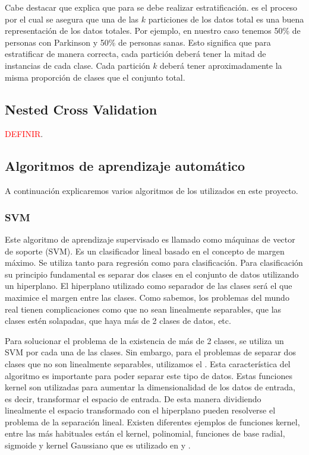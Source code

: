 Cabe destacar que \cite{CrossVal} explica que para  se debe realizar estratificación.  es el proceso por el cual se asegura que una de las $k$ particiones de los datos total es una buena representación de los datos totales. Por ejemplo, en nuestro caso tenemos 50\% de personas con Parkinson y 50\% de personas sanas. Esto significa que para estratificar de manera correcta, cada partición deberá tener la mitad de instancias de cada clase. Cada partición $k$ deberá tener aproximadamente la misma proporción de clases que el conjunto total.

\subsection{Nested Cross Validation}
\textcolor{red}{DEFINIR}.

\subsection{Algoritmos de aprendizaje automático}

A continuación explicaremos varios algoritmos de los utilizados en este proyecto.

\subsubsection{SVM \cite{svmexpl}}

Este algoritmo de aprendizaje supervisado es llamado como máquinas de vector de soporte (SVM). Es un clasificador lineal basado en el concepto de margen máximo. Se utiliza tanto para regresión como para clasificación. Para clasificación su principio fundamental es separar dos clases en el conjunto de datos utilizando un hiperplano. El hiperplano utilizado como separador de las clases será el que maximice el margen entre las clases. Como sabemos, los problemas del mundo real tienen complicaciones como que no sean linealmente separables, que las clases estén solapadas, que haya más de 2 clases de datos, etc. 

Para solucionar el problema de la existencia de más de 2 clases, se utiliza un SVM por cada una de las clases. Sin embargo, para el problemas de separar dos clases que no son linealmente separables, utilizamos el . Esta característica del algoritmo es importante para poder separar este tipo de datos. Estas funciones kernel son utilizadas para aumentar la dimensionalidad de los datos de entrada, es decir, transformar el espacio de entrada. De esta manera dividiendo linealmente el espacio transformado con el hiperplano pueden resolverse el problema de la separación lineal.  Existen diferentes ejemplos de funciones kernel, entre las más habituales están el kernel, polinomial, funciones de base radial, sigmoide y kernel Gaussiano que es utilizado en \cite{MxLtNovel} y \cite{Orz2016}.

